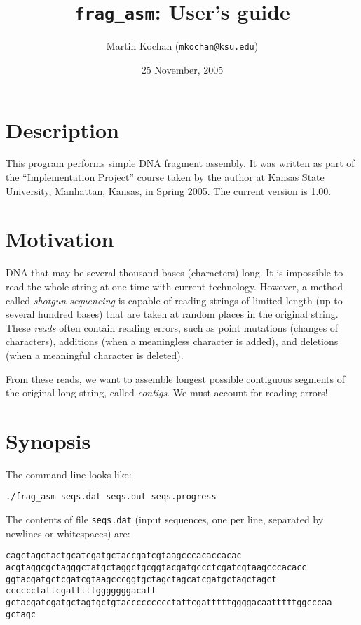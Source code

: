 \documentclass[11pt, oneside]{article}
\title{{\tt frag\_asm}: User's guide}
\author{Martin Kochan ({\tt mkochan@ksu.edu})}
\date{25 November, 2005}
\begin{document}
\maketitle

\section{Description}

This program performs simple DNA fragment assembly. 
It was written as part of the ``Implementation Project'' course taken by the author
at Kansas State University, Manhattan, Kansas, in Spring 2005.
The current version is 1.00.

\section{Motivation}

DNA that may be several thousand bases (characters) long. It is impossible to read the whole
string at one time with current technology. However, a method called \emph{shotgun sequencing}
is capable of reading strings of limited length (up to several hundred bases) that are taken at
random places in the original string. These \emph{reads} often contain reading errors, such as
point mutations (changes of characters), additions (when a meaningless character is added), and
deletions (when a meaningful character is deleted).

From these reads, we want to assemble longest possible contiguous segments of the original long
string, called \emph{contigs}. We must account for reading errors!

\section{Synopsis}

The command line looks like:
\begin{verbatim}
./frag_asm seqs.dat seqs.out seqs.progress 
\end{verbatim}

The contents of file {\tt seqs.dat} (input sequences, one per line, separated
by newlines or whitespaces) are:
\small
\begin{verbatim}
cagctagctactgcatcgatgctaccgatcgtaagcccacaccacac        
acgtaggcgctagggctatgctaggctgcggtacgatgccctcgatcgtaagcccacacc
ggtacgatgctcgatcgtaagcccggtgctagctagcatcgatgctagctagct
cccccctattcgatttttgggggggacatt
gctacgatcgatgctagtgctgtaccccccccctattcgatttttggggacaatttttggcccaa
gctagc
\end{verbatim} 
\normalsize
\end{document}

